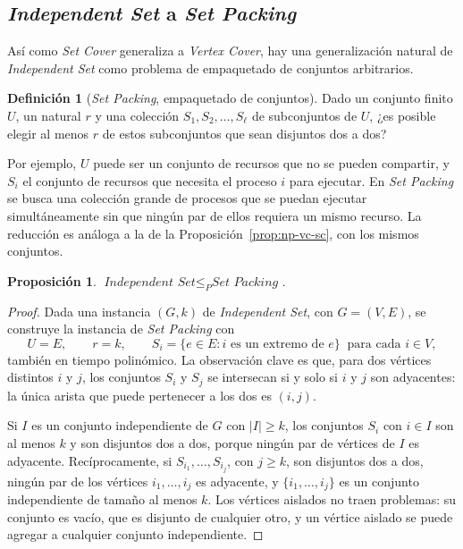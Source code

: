 \documentclass[12pt, spanish, oneside, openany]{book}
\newcommand{\redp}{\le_{P}}
\newcommand{\prob}[1]{\textit{#1}}
\newcommand{\IS}{\prob{Independent Set}\xspace}
\newcommand{\VC}{\prob{Vertex Cover}\xspace}
\newcommand{\SC}{\prob{Set Cover}\xspace}
\newcommand{\SP}{\prob{Set Packing}\xspace}
\theoremstyle{uprightplain}
\newtheorem{proposicion}[teorema]{Proposición}
\theoremstyle{definition}
\newtheorem{definicion}[teorema]{Definición}
\theoremstyle{remark}
\theoremstyle{definition}
\begin{document}
\subsection{\texorpdfstring{\prob{Independent Set} a \prob{Set Packing}}{Independent Set a Set Packing}}
\label{subsec:np-set-packing}

Así como \SC generaliza a \VC, hay una generalización natural de \IS como problema de empaquetado de conjuntos arbitrarios.

\begin{definicion}[\SP, empaquetado de conjuntos]
\label{def:np-sp}
Dado un conjunto finito $U$, un natural $r$ y una colección $S_1,S_2,\dots,S_\ell$ de subconjuntos de $U$, ¿es posible elegir al menos $r$ de estos subconjuntos que sean disjuntos dos a dos?
\end{definicion}

Por ejemplo, $U$ puede ser un conjunto de recursos que no se pueden compartir, y $S_i$ el conjunto de recursos que necesita el proceso $i$ para ejecutar. En \SP se busca una colección grande de procesos que se puedan ejecutar simultáneamente sin que ningún par de ellos requiera un mismo recurso. La reducción es análoga a la de la Proposición~\ref{prop:np-vc-sc}, con los mismos conjuntos.

\begin{proposicion}
\label{prop:np-is-sp}
$\IS\redp\SP$.
\end{proposicion}
\begin{proof}
Dada una instancia $(G,k)$ de \IS, con $G=(V,E)$, se construye la instancia de \SP con
\[
U=E,\qquad r=k,\qquad S_i=\{e\in E : i\text{ es un extremo de }e\}\ \text{ para cada } i\in V,
\]
también en tiempo polinómico. La observación clave es que, para dos vértices distintos $i$ y $j$, los conjuntos $S_i$ y $S_j$ se intersecan si y solo si $i$ y $j$ son adyacentes: la única arista que puede pertenecer a los dos es $(i,j)$.

Si $I$ es un conjunto independiente de $G$ con $|I|\ge k$, los conjuntos $S_i$ con $i\in I$ son al menos $k$ y son disjuntos dos a dos, porque ningún par de vértices de $I$ es adyacente. Recíprocamente, si $S_{i_1},\dots,S_{i_j}$, con $j\ge k$, son disjuntos dos a dos, ningún par de los vértices $i_1,\dots,i_j$ es adyacente, y $\{i_1,\dots,i_j\}$ es un conjunto independiente de tamaño al menos $k$. Los vértices aislados no traen problemas: su conjunto es vacío, que es disjunto de cualquier otro, y un vértice aislado se puede agregar a cualquier conjunto independiente.
\end{proof}
\end{document}
